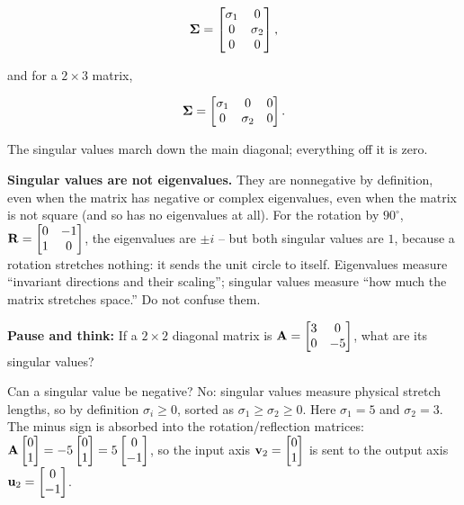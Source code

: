 \[
  \mathbf{\Sigma} = \begin{bmatrix} \sigma_1 & 0 \\ 0 & \sigma_2 \\ 0 & 0 \end{bmatrix},
\]

and for a $2 \times 3$ matrix,

\[
  \mathbf{\Sigma} = \begin{bmatrix} \sigma_1 & 0 & 0 \\ 0 & \sigma_2 & 0 \end{bmatrix}.
\]

The singular values march down the main diagonal; everything off it is zero.

\begin{trapbox}
\textbf{Singular values are not eigenvalues.} They are nonnegative by
definition, even when the matrix has negative or complex eigenvalues, even when
the matrix is not square (and so has no eigenvalues at all). For the rotation by
$90^\circ$, $\mathbf{R} = \begin{bmatrix} 0 & -1 \\ 1 & 0\end{bmatrix}$, the
eigenvalues are $\pm i$ -- but both singular values are $1$, because a rotation
stretches nothing: it sends the unit circle to itself. Eigenvalues measure
``invariant directions and their scaling''; singular values measure ``how much
the matrix stretches space.'' Do not confuse them.
\end{trapbox}

\begin{recoverybox}
\textbf{Pause and think:} If a $2\times 2$ diagonal matrix is $\mathbf{A} = \begin{bmatrix} 3 & 0 \\ 0 & -5 \end{bmatrix}$, what are its singular values?

Can a singular value be negative? No: singular values measure physical stretch lengths, so by definition $\sigma_i \ge 0$, sorted as $\sigma_1 \ge \sigma_2 \ge 0$. Here $\sigma_1 = 5$ and $\sigma_2 = 3$. The minus sign is absorbed into the rotation/reflection matrices: $\mathbf{A}\begin{bmatrix}0\\1\end{bmatrix} = -5\begin{bmatrix}0\\1\end{bmatrix} = 5\begin{bmatrix}0\\-1\end{bmatrix}$, so the input axis $\mathbf{v}_2 = \begin{bmatrix}0\\1\end{bmatrix}$ is sent to the output axis $\mathbf{u}_2 = \begin{bmatrix}0\\-1\end{bmatrix}$.
\end{recoverybox}

